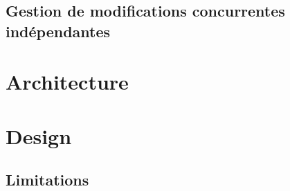 \documentclass{article}
\begin{document}
	\subsection{Gestion de modifications concurrentes indépendantes}
	
	\section{Architecture}
	
	\section{Design}
	
	\subsection{Limitations}
	 
\end{document}

